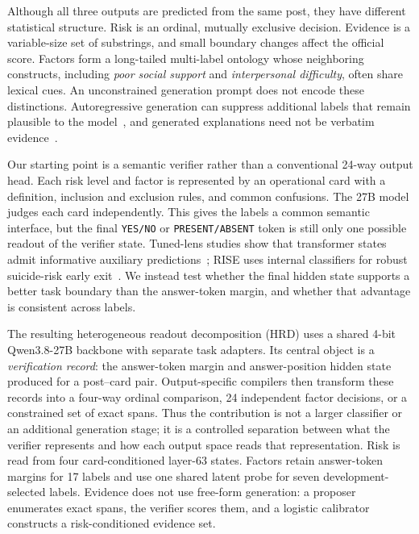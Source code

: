 \documentclass[conference]{IEEEtran}
\newcommand{\method}{\textsc{HRD}}
\begin{document}
Although all three outputs are predicted from the same post, they have different statistical structure. Risk is an ordinal, mutually exclusive decision. Evidence is a variable-size set of substrings, and small boundary changes affect the official score. Factors form a long-tailed multi-label ontology whose neighboring constructs, including \emph{poor social support} and \emph{interpersonal difficulty}, often share lexical cues. An unconstrained generation prompt does not encode these distinctions. Autoregressive generation can suppress additional labels that remain plausible to the model~\cite{ma2025multilabel}, and generated explanations need not be verbatim evidence~\cite{chim2024overview,tran2024ism}.

Our starting point is a semantic verifier rather than a conventional 24-way output head. Each risk level and factor is represented by an operational card with a definition, inclusion and exclusion rules, and common confusions. The 27B model judges each card independently. This gives the labels a common semantic interface, but the final \texttt{YES/NO} or \texttt{PRESENT/ABSENT} token is still only one possible readout of the verifier state. Tuned-lens studies show that transformer states admit informative auxiliary predictions~\cite{belrose2023tunedlens}; RISE uses internal classifiers for robust suicide-risk early exit~\cite{soun2024rise}. We instead test whether the final hidden state supports a better task boundary than the answer-token margin, and whether that advantage is consistent across labels.

The resulting heterogeneous readout decomposition (\method{}) uses a shared 4-bit Qwen3.8-27B backbone with separate task adapters. Its central object is a \emph{verification record}: the answer-token margin and answer-position hidden state produced for a post--card pair. Output-specific compilers then transform these records into a four-way ordinal comparison, 24 independent factor decisions, or a constrained set of exact spans. Thus the contribution is not a larger classifier or an additional generation stage; it is a controlled separation between what the verifier represents and how each output space reads that representation. Risk is read from four card-conditioned layer-63 states. Factors retain answer-token margins for 17 labels and use one shared latent probe for seven development-selected labels. Evidence does not use free-form generation: a proposer enumerates exact spans, the verifier scores them, and a logistic calibrator constructs a risk-conditioned evidence set.
\end{document}
